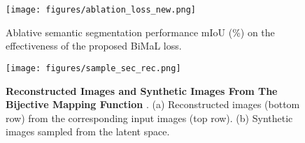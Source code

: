 \documentclass[10pt,twocolumn,letterpaper]{article}
\begin{document}
\begin{figure}[t]
    \centering
    \texttt{[image: figures/ablation\_loss\_new.png]}
    \caption{Ablative semantic segmentation performance mIoU (\%) on the effectiveness of the proposed BiMaL loss.}
\label{fig:ablation_loss}
\end{figure}


\begin{figure}[t]
    \centering
\texttt{[image: figures/sample\_sec\_rec.png]}
    \caption{\textbf{Reconstructed Images and Synthetic Images From The Bijective Mapping Function }. (a) Reconstructed images (bottom row) from the corresponding input images (top row). (b) Synthetic images sampled from the latent space.} \label{fig:rec_images}
    \vspace{-4mm}
\end{figure}
\end{document}
